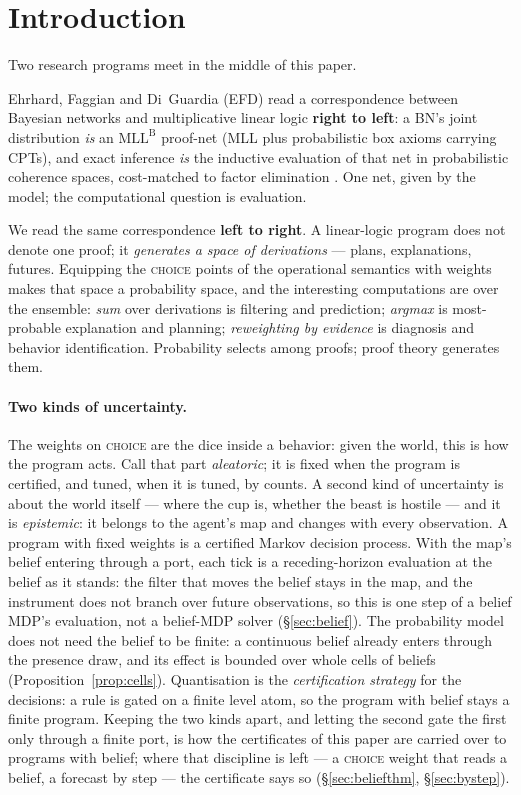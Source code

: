 \documentclass[11pt]{article}
\newcommand{\mllb}{\mathrm{MLL}^{\mathrm B}}
\theoremstyle{plain}
\theoremstyle{definition}
\theoremstyle{remark}
\begin{document}
\section{Introduction}\label{sec:intro}

Two research programs meet in the middle of this paper.

Ehrhard, Faggian and Di~Guardia (EFD) read a correspondence between
Bayesian networks and multiplicative linear logic \textbf{right to left}:
a BN's joint distribution \emph{is} an $\mllb$ proof-net (MLL plus
probabilistic box axioms carrying CPTs), and exact inference \emph{is}
the inductive evaluation of that net in probabilistic coherence spaces,
cost-matched to factor elimination \cite{EFD24,EFD26}. One net, given by
the model; the computational question is evaluation.

We read the same correspondence \textbf{left to right}. A linear-logic
program does not denote one proof; it \emph{generates a space of
derivations} --- plans, explanations, futures. Equipping the
\textsc{choice} points of the operational semantics with weights makes
that space a probability space, and the interesting computations are over
the ensemble: \emph{sum} over derivations is filtering and prediction;
\emph{argmax} is most-probable explanation and planning;
\emph{reweighting by evidence} is diagnosis and behavior identification.
Probability selects among proofs; proof theory generates them.

\paragraph{Two kinds of uncertainty.} The weights on \textsc{choice}
are the dice inside a behavior: given the world, this is how the
program acts. Call that part \emph{aleatoric}; it is fixed when the
program is certified, and tuned, when it is tuned, by counts. A second
kind of uncertainty is about the world itself --- where the cup is,
whether the beast is hostile --- and it is \emph{epistemic}: it belongs
to the agent's map and changes with every observation. A program with
fixed weights is a certified Markov decision process. With the map's
belief entering through a port, each tick is a receding-horizon
evaluation at the belief as it stands: the filter that moves the belief
stays in the map, and the instrument does not branch over future
observations, so this is one step of a belief MDP's evaluation, not a
belief-MDP solver (\S\ref{sec:belief}). The probability model does not
need the belief to be finite: a continuous belief already enters through
the presence draw, and its effect is bounded over whole cells of beliefs
(Proposition~\ref{prop:cells}). Quantisation is the \emph{certification
strategy} for the decisions: a rule is gated on a finite level atom, so
the program with belief stays a finite program. Keeping the two kinds
apart, and letting the second gate the first only through a finite port,
is how the certificates of this paper are carried over to programs with
belief; where that discipline is left --- a \textsc{choice} weight that
reads a belief, a forecast by step --- the certificate says so
(\S\ref{sec:beliefthm}, \S\ref{sec:bystep}).
\end{document}
